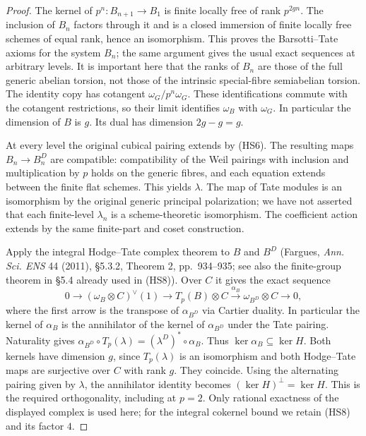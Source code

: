 \begin{proof}
The kernel of \(p^n:B_{n+1}\to B_1\) is finite locally free of
rank \(p^{2gn}\). The inclusion of \(B_n\) factors through it and
is a closed immersion of finite locally free schemes of equal rank,
hence an isomorphism. This proves the Barsotti--Tate axioms for
the system \(B_n\); the same argument gives the usual exact sequences
at arbitrary levels. It is important here that the ranks of
\(B_n\) are those of the full generic abelian torsion, not those
of the intrinsic special-fibre semiabelian torsion.
The identity copy has cotangent \(\omega_G/p^n\omega_G\).
These identifications commute with the cotangent restrictions, so
their limit identifies \(\omega_B\) with \(\omega_G\).
In particular the dimension of \(B\) is \(g\). Its dual has dimension
\(2g-g=g\).

At every level the original cubical pairing extends by (HS6).
The resulting maps \(B_n\to B_n^D\) are compatible: compatibility
of the Weil pairings with inclusion and multiplication by \(p\)
holds on the generic fibres, and each equation extends between the
finite flat schemes. This yields \(\lambda\). The map of Tate modules
is an isomorphism by the original generic principal polarization;
we have not asserted that each finite-level \(\lambda_n\) is a
scheme-theoretic isomorphism. The coefficient action extends by
the same finite-part and coset construction.

Apply the integral Hodge--Tate complex theorem to \(B\) and \(B^D\)
(Fargues, \emph{Ann. Sci. ENS} 44 (2011), \S5.3.2, Theorem 2,
pp.~934--935; see also the finite-group theorem in \S5.4
already used in (HS8)). Over \(C\) it gives the exact sequence
\[
 0\longrightarrow(\omega_B\otimes C)^\vee(1)
 \longrightarrow T_p(B)\otimes C
 \xrightarrow{\alpha_B} \omega_{B^D}\otimes C
 \longrightarrow0 ,
\]
where the first arrow is the transpose of \(\alpha_{B^D}\) via
Cartier duality. In particular the kernel of \(\alpha_B\) is the
annihilator of the kernel of \(\alpha_{B^D}\) under the Tate pairing.
Naturality gives
\(\alpha_{B^D}\circ T_p(\lambda)=(\lambda^D)^*\circ\alpha_B\).
Thus \(\ker\alpha_B\subseteq\ker H\). Both kernels have dimension
\(g\), since \(T_p(\lambda)\) is an isomorphism and both Hodge--Tate
maps are surjective over \(C\) with rank \(g\). They coincide.
Using the alternating pairing given by \(\lambda\), the annihilator
identity becomes \((\ker H)^\perp=\ker H\).
This is the required orthogonality, including at \(p=2\).
Only rational exactness of the displayed complex is used here;
for the integral cokernel bound we retain (HS8) and its factor \(4\).
\end{proof}


